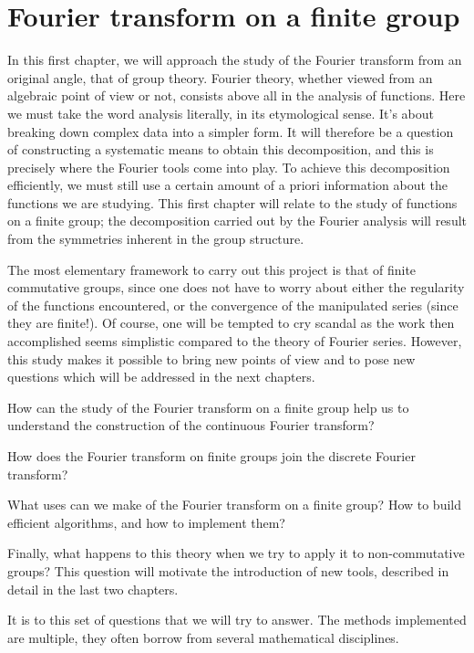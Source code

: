 
\chapter{Fourier transform on a finite group}
\label{chap-transforme-fourier-finite-group}



In this first chapter, we will approach the study of the Fourier transform from an original angle, that of group theory. Fourier theory, whether viewed from an algebraic point of view or not, consists above all in the analysis of functions. Here we must take the word analysis literally, in its etymological sense. It's about breaking down complex data into a simpler form. It will therefore be a question of constructing a systematic means to obtain this decomposition, and this is precisely where the Fourier tools come into play. To achieve this decomposition efficiently, we must still use a certain amount of a priori information about the functions we are studying. This first chapter will relate to the study of functions on a finite group; the  decomposition carried out by the Fourier analysis will result from the symmetries inherent in the group structure. 

The most elementary framework to carry out this project is that of finite commutative groups, since one does not have to worry about either the regularity of the functions encountered, or the convergence of the manipulated series (since they are finite!). Of course, one will be tempted to cry scandal as the work then accomplished seems simplistic compared to the  theory of Fourier series. However, this study makes it possible to bring new points of view and to pose new questions which will be addressed in the next chapters.
\begin{rs}
\item How can the study of the Fourier transform on a finite group help us to understand the construction of the continuous Fourier transform?
\item How does the Fourier transform on finite groups join the discrete Fourier transform?
\item What uses can we make of the Fourier transform on a finite group? How to build efficient algorithms, and how to implement them?
\item Finally, what happens to this theory when we try to apply it to non-commutative groups? This question will motivate the introduction of new tools, described in detail in the last two chapters.
\end{rs} It is to this set of questions that we will try to answer. The methods implemented are multiple, they often borrow from several mathematical disciplines.

